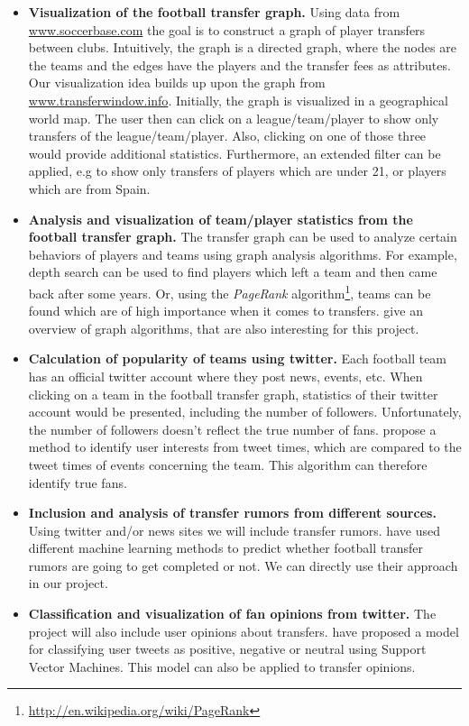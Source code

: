 \documentclass{article}
\begin{document}
\begin{itemize}
	\item \textbf{Visualization of the football transfer graph.} Using data from \url{www.soccerbase.com} the goal is to construct a graph of player transfers between clubs. Intuitively, the graph is a directed graph, where the nodes are the teams and the edges have the players and the transfer fees as attributes. Our visualization idea builds up upon the graph from \url{www.transferwindow.info}. Initially, the graph is visualized in a geographical world map. The user then can click on a league/team/player to show only transfers of the league/team/player. Also, clicking on one of those three would provide additional statistics. Furthermore, an extended filter can be applied, e.g to show only transfers of players which are under 21, or players which are from Spain.
	
	\item \textbf{Analysis and visualization of team/player statistics from the football transfer graph.} The transfer graph can be used to analyze certain behaviors of players and teams using graph analysis algorithms. For example, depth search can be used to find players which left a team and then came back after some years. Or, using the \emph{PageRank} algorithm\footnote{\url{http://en.wikipedia.org/wiki/PageRank}}, teams can be found which are of high importance when it comes to transfers. \cite{brath} give an overview of graph algorithms, that are also interesting for this project.
	
	\item \textbf{Calculation of popularity of teams using twitter.} Each football team has an official twitter account where they post news, events, etc. When clicking on a team in the football transfer graph, statistics of their twitter account would be presented, including the number of followers. Unfortunately, the number of followers doesn't reflect the true number of fans. \cite{Ramasamy:2013:IUI:2512938.2512960} propose a method to identify user interests from tweet times, which are compared to the tweet times of events concerning the team. This algorithm can therefore identify true fans.
	
	\item \textbf{Inclusion and analysis of transfer rumors from different sources.} Using twitter and/or news sites we will include transfer rumors. \cite{Kunneman+12} have used different machine learning methods to predict whether football transfer rumors are going to get completed or not. We can directly use their approach in our project.
	
	\item \textbf{Classification and visualization of fan opinions from twitter.} The project will also include user opinions about transfers. \cite{Shrivatava2014} have proposed a model for classifying user tweets as positive, negative or neutral using Support Vector Machines. This model can also be applied to transfer opinions.
\end{itemize}
\end{document}
